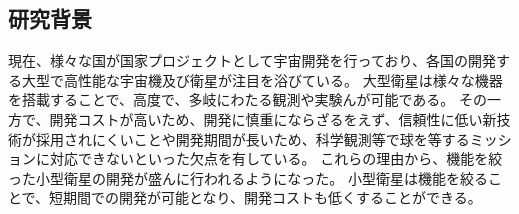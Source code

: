 \subsection{研究背景}

現在、様々な国が国家プロジェクトとして宇宙開発を行っており、各国の開発する大型で高性能な宇宙機及び衛星が注目を浴びている。
大型衛星は様々な機器を搭載することで、高度で、多岐にわたる観測や実験んが可能である。
その一方で、開発コストが高いため、開発に慎重にならざるをえず、信頼性に低い新技術が採用されにくいことや開発期間が長いため、科学観測等で球を等するミッションに対応できないといった欠点を有している。
これらの理由から、機能を絞った小型衛星の開発が盛んに行われるようになった。
小型衛星は機能を絞ることで、短期間での開発が可能となり、開発コストも低くすることができる。

